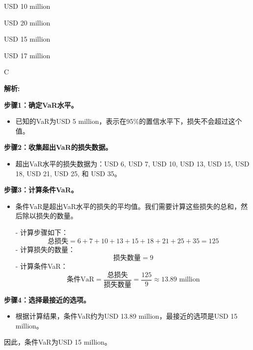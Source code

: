 \documentclass{article}
\newenvironment{explanation}
{\textbf{解析:}\par}
{\par}
\begin{document}
    \begin{choices}
        \item USD 10 million 
        \item USD 20 million 
        \item USD 15 million 
        \item USD 17 million
    \end{choices}
    
    \begin{correctanswer}
       C
    \end{correctanswer}
    
    \begin{explanation}
    
        \textbf{步骤1：确定VaR水平。}
        \begin{itemize}
            \item 已知的VaR为USD 5 million，表示在95\%的置信水平下，损失不会超过这个值。
        \end{itemize}
        
        \textbf{步骤2：收集超出VaR的损失数据。}
        \begin{itemize}
            \item 超出VaR水平的损失数据为：USD 6, USD 7, USD 10, USD 13, USD 15, USD 18, USD 21, USD 25, 和 USD 35。
        \end{itemize}
        
        \textbf{步骤3：计算条件VaR。}
        \begin{itemize}
            \item 条件VaR是超出VaR水平的损失的平均值。我们需要计算这些损失的总和，然后除以损失的数量。
           
            - 计算步骤如下：
            \[
            \text{总损失} = 6 + 7 + 10 + 13 + 15 + 18 + 21 + 25 + 35 = 125
            \]
            - 计算损失的数量：
            \[
            \text{损失数量} = 9
            \]
            - 计算条件VaR：
            \[
            \text{条件VaR} = \frac{\text{总损失}}{\text{损失数量}} = \frac{125}{9} \approx 13.89 \text{ million}
            \]
        \end{itemize}
        
        \textbf{步骤4：选择最接近的选项。}
        \begin{itemize}
            \item 根据计算结果，条件VaR约为USD 13.89 million，最接近的选项是USD 15 million。
        \end{itemize}
        
        因此，条件VaR为USD 15 million。
    \end{explanation}
    
\end{document}
